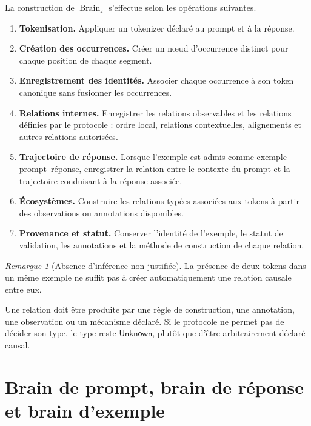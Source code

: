 \documentclass[11pt,a4paper,oneside]{book}
\theoremstyle{remark}
\newtheorem{remarque}[definition]{Remarque}
\DeclareMathOperator{\Brain}{Brain}
\newcommand{\Unknown}{\mathsf{Unknown}}
\begin{document}
La construction de \(\Brain_z\) s'effectue selon les opérations
suivantes.

\begin{enumerate}[label=\textbf{Étape \arabic*.}]
  \item \textbf{Tokenisation.}
        Appliquer un tokenizer déclaré au prompt et à la réponse.

  \item \textbf{Création des occurrences.}
        Créer un nœud d'occurrence distinct pour chaque position
        de chaque segment.

  \item \textbf{Enregistrement des identités.}
        Associer chaque occurrence à son token canonique sans
        fusionner les occurrences.

  \item \textbf{Relations internes.}
        Enregistrer les relations observables et les relations
        définies par le protocole : ordre local, relations
        contextuelles, alignements et autres relations autorisées.

  \item \textbf{Trajectoire de réponse.}
        Lorsque l'exemple est admis comme exemple prompt--réponse,
        enregistrer la relation entre le contexte du prompt et
        la trajectoire conduisant à la réponse associée.

  \item \textbf{Écosystèmes.}
        Construire les relations typées associées aux tokens à partir
        des observations ou annotations disponibles.

  \item \textbf{Provenance et statut.}
        Conserver l'identité de l'exemple, le statut de validation,
        les annotations et la méthode de construction de chaque
        relation.
\end{enumerate}

\begin{remarque}[Absence d'inférence non justifiée]
La présence de deux tokens dans un même exemple ne suffit pas à
créer automatiquement une relation causale entre eux.

Une relation doit être produite par une règle de construction,
une annotation, une observation ou un mécanisme déclaré. Si le
protocole ne permet pas de décider son type, le type reste
\(\Unknown\), plutôt que d'être arbitrairement déclaré causal.
\end{remarque}

\section{Brain de prompt, brain de réponse et brain d'exemple}
\end{document}
